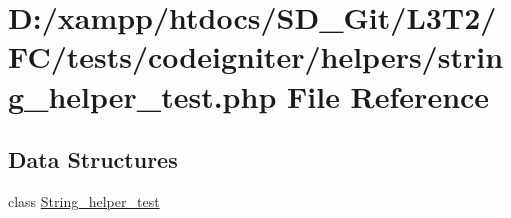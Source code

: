 \hypertarget{tests_2codeigniter_2helpers_2string__helper__test_8php}{}\section{D\+:/xampp/htdocs/\+S\+D\+\_\+\+Git/\+L3\+T2/\+F\+C/tests/codeigniter/helpers/string\+\_\+helper\+\_\+test.php File Reference}
\label{tests_2codeigniter_2helpers_2string__helper__test_8php}
\subsection*{Data Structures}
\begin{DoxyCompactItemize}
\item 
class \hyperlink{class_string__helper__test}{String\+\_\+helper\+\_\+test}
\end{DoxyCompactItemize}
